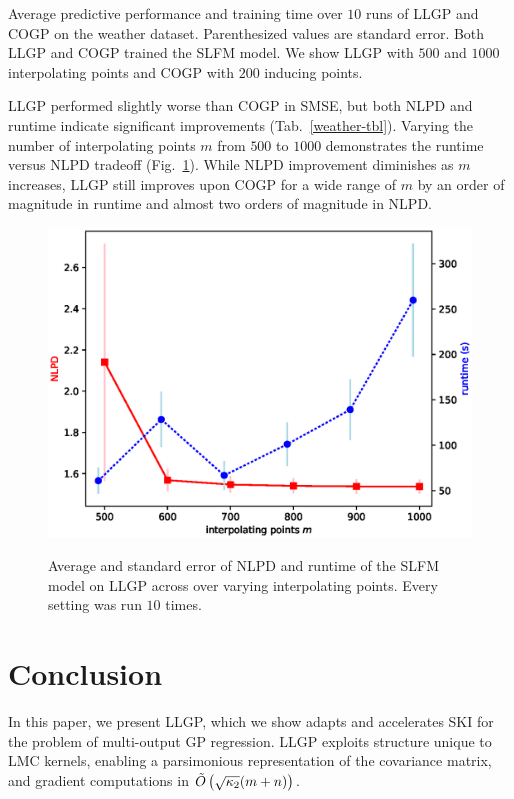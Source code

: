 \documentclass{article}
\begin{document}
\begin{table}[!h]
  \caption{Average predictive performance and training time over $10$ runs of LLGP and COGP on the weather dataset. Parenthesized values are standard error. Both LLGP and COGP trained the SLFM model. We show LLGP with $500$ and $1000$ interpolating points and COGP with $200$ inducing points.}
\label{weather-tbl}
\begin{center}
  \begin{small}
    \begin{sc}
      
\end{sc}
\end{small}
\end{center}
\end{table}

LLGP performed slightly worse than COGP in SMSE, but both NLPD and runtime indicate significant improvements (Tab.~\ref{weather-tbl}). Varying the number of interpolating points $m$ from $500$ to $1000$ demonstrates the runtime versus NLPD tradeoff (Fig.~\ref{fig:llgpweather}). While NLPD improvement diminishes as $m$ increases, LLGP still improves upon COGP for a wide range of $m$ by an order of magnitude in runtime and almost two orders of magnitude in NLPD.

\begin{figure}
\centering
{\includegraphics[width=0.4\columnwidth]{m_time_nlpd.eps}}
\caption{Average and standard error of NLPD and runtime of the SLFM model on LLGP across over varying interpolating points. Every setting was run $10$ times.}
\label{fig:llgpweather}
\end{figure} 

\section{Conclusion}\label{conclusion}

In this paper, we present LLGP, which we show adapts and accelerates SKI \cite{kiss-gp} for the problem of multi-output GP regression. LLGP exploits structure unique to LMC kernels,  enabling a parsimonious representation of the covariance matrix, and gradient computations in $\tilde{O}\left({\sqrt{\kappa_2}(m+n)}\right)$.
\end{document}

